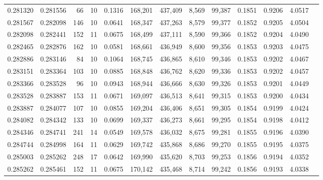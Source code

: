 \begin{tabular}{rrrrrrrrrrrrr}
0.281320 & 0.281556 &    66 &  10 &                                     0.1316 & 168,201 & 437,409 &   8,569 &  99,387 & 0.1851 & 0.9206 & 4.0517 \\
0.281567 & 0.282098 &   146 &  10 &                                     0.0641 & 168,347 & 437,263 &   8,579 &  99,377 & 0.1852 & 0.9205 & 4.0504 \\
0.282098 & 0.282441 &   152 &  11 &                                     0.0675 & 168,499 & 437,111 &   8,590 &  99,366 & 0.1852 & 0.9204 & 4.0490 \\
0.282465 & 0.282876 &   162 &  10 &                                     0.0581 & 168,661 & 436,949 &   8,600 &  99,356 & 0.1853 & 0.9203 & 4.0475 \\
0.282886 & 0.283146 &    84 &  10 &                                     0.1064 & 168,745 & 436,865 &   8,610 &  99,346 & 0.1853 & 0.9202 & 4.0467 \\
0.283151 & 0.283364 &   103 &  10 &                                     0.0885 & 168,848 & 436,762 &   8,620 &  99,336 & 0.1853 & 0.9202 & 4.0457 \\
0.283366 & 0.283528 &    96 &  10 &                                     0.0943 & 168,944 & 436,666 &   8,630 &  99,326 & 0.1853 & 0.9201 & 4.0449 \\
0.283528 & 0.283887 &   153 &  11 &                                     0.0671 & 169,097 & 436,513 &   8,641 &  99,315 & 0.1853 & 0.9200 & 4.0434 \\
0.283887 & 0.284077 &   107 &  10 &                                     0.0855 & 169,204 & 436,406 &   8,651 &  99,305 & 0.1854 & 0.9199 & 4.0424 \\
0.284082 & 0.284342 &   133 &  10 &                                     0.0699 & 169,337 & 436,273 &   8,661 &  99,295 & 0.1854 & 0.9198 & 4.0412 \\
0.284346 & 0.284741 &   241 &  14 &                                     0.0549 & 169,578 & 436,032 &   8,675 &  99,281 & 0.1855 & 0.9196 & 4.0390 \\
0.284744 & 0.284998 &   164 &  11 &                                     0.0629 & 169,742 & 435,868 &   8,686 &  99,270 & 0.1855 & 0.9195 & 4.0375 \\
0.285003 & 0.285262 &   248 &  17 &                                     0.0642 & 169,990 & 435,620 &   8,703 &  99,253 & 0.1856 & 0.9194 & 4.0352 \\
0.285262 & 0.285461 &   152 &  11 &                                     0.0675 & 170,142 & 435,468 &   8,714 &  99,242 & 0.1856 & 0.9193 & 4.0338 \\

\end{tabular}
